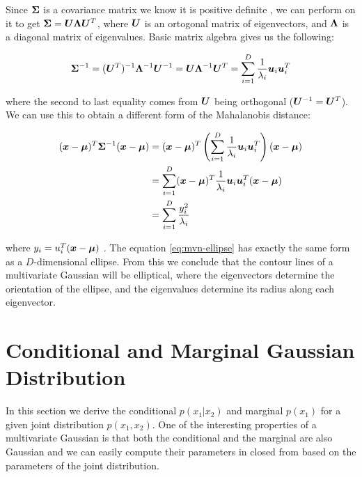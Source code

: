 Since ${\bm{\Sigma}}$ is a covariance matrix we know it is positive definite , we can perform  on it to get ${\bm{\Sigma}} = {\bm{U}} {\bm{\Lambda}} {\bm{U}}^T$, where ${\bm{U}}$ is an ortogonal matrix of eigenvectors, and ${\bm{\Lambda}}$ is a diagonal matrix of eigenvalues. Basic matrix algebra gives us the following:

\begin{equation}
{\bm{\Sigma}}^{-1} = ({\bm{U}}^T)^{-1} {\bm{\Lambda}}^{-1} {\bm{U}}^{-1} = {\bm{U}} {\bm{\Lambda}}^{-1} {\bm{U}}^T = \sum_{i = 1}^D \frac{1}{\lambda_i} {\bm{u}}_i {\bm{u}}_i^T
\end{equation}

where the second to last equality comes from ${\bm{U}}$ being orthogonal (${\bm{U}}^{-1} = {\bm{U}}^T$). We can use this to obtain a different form of the Mahalanobis distance: 

\begin{align}
({\bm{x}} - {\bm{\mu}})^T {\bm{\Sigma}}^{-1} ({\bm{x}} - {\bm{\mu}}) &= ({\bm{x}} - {\bm{\mu}})^T \left( \sum_{i = 1}^D \frac{1}{\lambda_i} {\bm{u}}_i {\bm{u}}_i^T \right) ({\bm{x}} - {\bm{\mu}}) \\
&= \sum_{i = 1}^D ({\bm{x}} - {\bm{\mu}})^T \frac{1}{\lambda_i} {\bm{u}}_i {\bm{u}}_i^T ({\bm{x}} - {\bm{\mu}}) \\
&= \sum_{i = 1}^D \frac{y_i^2}{\lambda_i} \label{eq:mvn-ellipse}
\end{align}

where $y_i = u_{i}^{T} ({\bm{x}} - {\bm{\mu}})$ . The equation \eqref{eq:mvn-ellipse} has exactly the same form as a $D$-dimensional ellipse. From this we conclude that the contour lines of a multivariate Gaussian will be elliptical, where the eigenvectors determine the orientation of the ellipse, and the eigenvalues determine its radius  along each eigenvector.


\section{Conditional and Marginal Gaussian Distribution}

In this section we derive the conditional $p(x_1 | x_2)$ and marginal $p(x_1)$ for a given joint distribution $p(x_1, x_2)$. One of the interesting properties of a multivariate Gaussian is that both the conditional and the marginal are also Gaussian and we can easily compute their parameters in closed from based on the parameters of the joint distribution.

